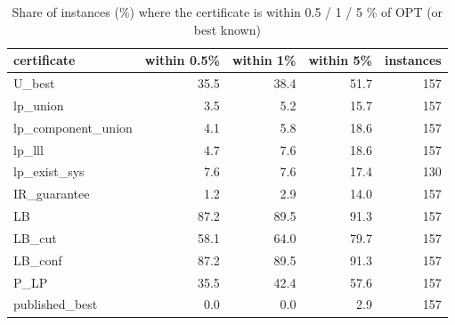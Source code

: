 \begin{table}[htbp]
\centering
\small
\caption{Share of instances (\%) where the certificate is within 0.5 / 1 / 5 \% of OPT (or best known)}
\label{tab:E1_certificates_within}
\begin{tabular}{lrrrr}
\toprule
certificate & within 0.5\% & within 1\% & within 5\% & instances \\
\midrule
U\_best & 35.5 & 38.4 & 51.7 & 157 \\
lp\_union & 3.5 & 5.2 & 15.7 & 157 \\
lp\_component\_union & 4.1 & 5.8 & 18.6 & 157 \\
lp\_lll & 4.7 & 7.6 & 18.6 & 157 \\
lp\_exist\_sys & 7.6 & 7.6 & 17.4 & 130 \\
IR\_guarantee & 1.2 & 2.9 & 14.0 & 157 \\
LB & 87.2 & 89.5 & 91.3 & 157 \\
LB\_cut & 58.1 & 64.0 & 79.7 & 157 \\
LB\_conf & 87.2 & 89.5 & 91.3 & 157 \\
P\_LP & 35.5 & 42.4 & 57.6 & 157 \\
published\_best & 0.0 & 0.0 & 2.9 & 157 \\
\bottomrule
\end{tabular}
\end{table}
